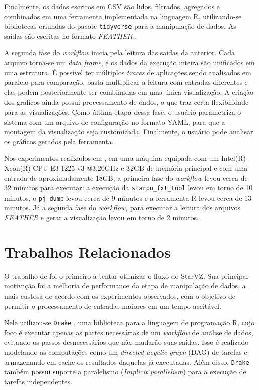 Finalmente, os dados escritos em CSV são lidos, filtrados, agregados e combinados em 
uma ferramenta implementada na linguagem R, utilizando-se bibliotecas oriundas do pacote 
\texttt{tidyverse} para a manipulação de dados. As saídas são escritas no formato \emph{FEATHER}
\cite{ref:feather}.

A segunda fase do \emph{workflow} inicia pela leitura das saídas da anterior. Cada arquivo
torna-se um \emph{data frame}, e os dados da execução inteira são unificados em uma estrutura.
É possível ter múltiplos \emph{traces} de aplicações sendo analisados em paralelo
para comparação, basta multiplicar a leitura com entradas diferentes e 
elas podem posteriormente ser combinadas em uma única visualização. A criação dos gráficos ainda 
possui processamento de dados, o que traz certa flexibilidade para as visualizações. Como última etapa dessa fase, o usuário 
parametriza o sistema com um arquivo de configuração no formato YAML, para que a montagem da visualização seja customizada. Finalmente, o usuário pode analisar os gráficos gerados pela ferramenta.

Nos experimentos realizados em \citet{ref:starvz}, em uma máquina equipada com um Intel(R) Xeon(R) 
CPU E3-1225 v3 @3.20GHz e 32GB de memória principal e com uma entrada de aproximadamente 18GB, a 
primeira fase do \emph{workflow} levou cerca de 32 minutos para executar: a execução da \texttt{starpu\_fxt\_tool}
levou em torno de 10 minutos, o \texttt{pj\_dump} levou cerca de 9 minutos e a ferramenta R levou cerca de 13
minutos. Já a segunda fase do \emph{workflow}, para executar a leitura dos arquivos \emph{FEATHER} e gerar
a visualização levou em torno de 2 minutos.

\section{Trabalhos Relacionados}\label{sect:related-work}

O trabalho de \citet{ref:drakestarvz} foi o primeiro a tentar otimizar o fluxo do StarVZ. 
Sua principal motivação foi a melhoria de performance da etapa de manipulação de dados, a mais
custosa de acordo com os experimentos observados, com o objetivo de permitir o processamento de 
entradas maiores em um tempo aceitável.

Nele utilizou-se \texttt{Drake} \cite{ref:drake}, uma biblioteca para a linguagem de programação R, cujo foco é executar apenas as 
partes necessárias de um \emph{workflow} de análise de dados, evitando os passos desnecessários que não mudarão
suas saídas. Isso é realizado modelando as computações como um \emph{directed acyclic graph} (DAG) de tarefas e 
armazenando em cache os resultados daquelas já executadas. Além disso, \texttt{Drake} também possui suporte a paralelismo
(\emph{Implicit parallelism}) para a execução de tarefas independentes.

